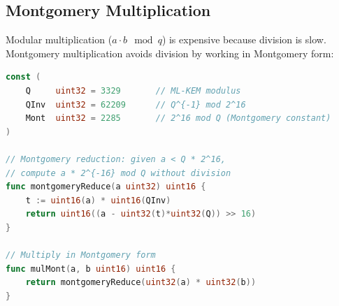 \subsection{Montgomery Multiplication}

Modular multiplication ($a \cdot b \mod q$) is expensive because division is slow.
Montgomery multiplication avoids division by working in Montgomery form:

\begin{lstlisting}[language=Go,caption={Montgomery multiplication}]
const (
    Q     uint32 = 3329       // ML-KEM modulus
    QInv  uint32 = 62209      // Q^{-1} mod 2^16
    Mont  uint32 = 2285       // 2^16 mod Q (Montgomery constant)
)

// Montgomery reduction: given a < Q * 2^16,
// compute a * 2^{-16} mod Q without division
func montgomeryReduce(a uint32) uint16 {
    t := uint16(a) * uint16(QInv)
    return uint16((a - uint32(t)*uint32(Q)) >> 16)
}

// Multiply in Montgomery form
func mulMont(a, b uint16) uint16 {
    return montgomeryReduce(uint32(a) * uint32(b))
}
\end{lstlisting}

